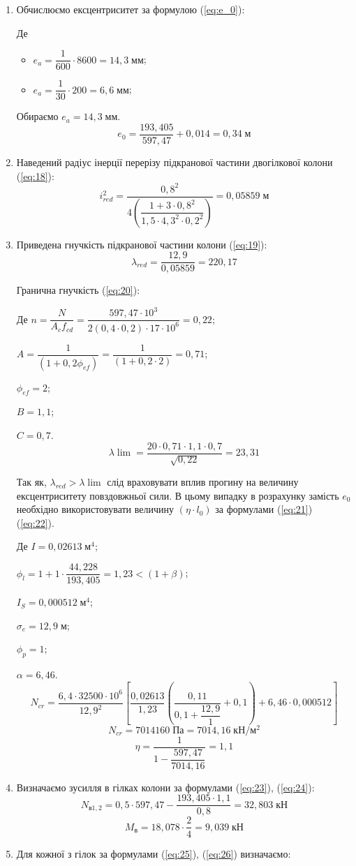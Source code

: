 \documentclass[a4paper,14pt]{article}
\begin{document}
\begin{enumerate}
    \item Обчислюємо ексцентриситет за формулою (\ref{eq:e_0}):
        
        Де \begin{itemize}
                \item $e_a = \dfrac{1}{600} \cdot 8600 = 14,3\;\textit{мм}$;
                \item $e_a = \dfrac{1}{30} \cdot 200 = 6,6\;\textit{мм}$;
            \end{itemize}
        Обираємо $e_a = 14,3\;\textit{мм}$.
        $$e_0 = \dfrac{193,405}{597,47}+0,014 = 0,34\;\textit{м}$$
    \item Наведений радіус інерції перерізу підкранової частини двогілкової колони (\ref{eq:18}):  
        $$i_{red}^2 = \dfrac{0,8^2}{4 \left(\dfrac{1+3 \cdot 0,8^2}{1,5 \cdot 4,3^2 \cdot 0,2^2} \right)} = 0,05859\;\textit{м}$$
    \item Приведена гнучкість підкранової частини колони (\ref{eq:19}):
        $$\lambda_{red} = \dfrac{12,9}{0,05859} = 220,17$$
        
        Гранична гнучкість (\ref{eq:20}):

        Де $n = \dfrac{N}{A_cf_{cd}} = \dfrac{597,47 \cdot 10^3}{2(0,4 \cdot 0,2) \cdot 17 \cdot 10^6} = 0,22$;

            $A = \dfrac{1}{(1+0,2\phi_{ef})} = \dfrac{1}{(1+0,2 \cdot 2)} = 0,71$;

            $\phi_{ef} = 2$;

            $B = 1,1$;

            $C = 0,7$.
            $$\lambda\lim = \dfrac{20 \cdot 0,71 \cdot 1,1 \cdot 0,7}{\sqrt{0,22}} = 23,31$$

        Так як, $\lambda_{red} > \lambda\lim$ слід враховувати вплив прогину на величину ексцентриситету повздовжньої сили. В цьому випадку в розрахунку замість $e_0$ необхідно використовувати
        величину $(\eta \cdot l_0)$ за формулами (\ref{eq:21}) (\ref{eq:22}).
        
        Де $I = 0,02613\;\textit{м}^4$;

        $\phi_l = 1 + 1 \cdot \dfrac{44,228}{193,405} = 1,23 < (1 + \beta)$;

        $I_S = 0,000512\;\textit{м}^4$;

        $\sigma_e = 12,9\;\textit{м}$;

        $\phi_p = 1$;

        $\alpha = 6,46$.
        $$N_{cr} = \dfrac{6,4 \cdot 32500 \cdot 10^6}{12,9^2}\left[\dfrac{0,02613}{1,23}\left(\dfrac{0,11}{0,1 + \dfrac{12,9}{1}} + 0,1\right) + 6,46 \cdot 0,000512\right]$$
        $$N_{cr} = 7014160\;\textit{Па} = 7014,16\;\textit{кН}/\textit{м}^2$$
        $$\eta = \dfrac{1}{1 - \dfrac{597,47}{7014,16}} = 1,1$$
    \item Визначаємо зусилля в гілках колони за формулами (\ref{eq:23}), (\ref{eq:24}):
        $$N_{\textit{в}1,2} = 0,5 \cdot 597,47 - \dfrac{193,405 \cdot 1,1}{0,8} = 32,803\;\textit{кН}$$
        $$M_\textit{в} = 18,078 \cdot \dfrac{2}{4} = 9,039\;\textit{кН}$$
    \item Для кожної з гілок за формулами (\ref{eq:25}), (\ref{eq:26}) визначаємо:


\end{enumerate}
\end{document}
